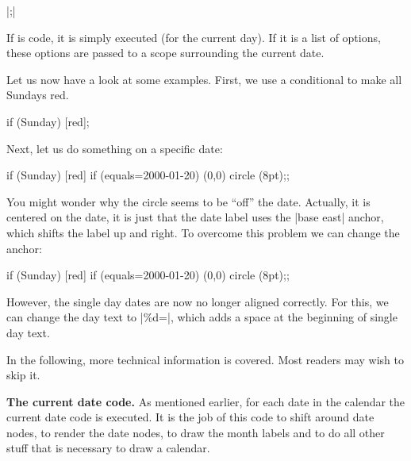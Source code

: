 \begin{command}{\calendar {}|;|}
\begin{enumerate}
    If  is code, it is simply executed (for the
    current day). If it is a list of options, these options are passed
    to a scope surrounding the current date.
  \end{enumerate}
  Let us now have a look at some examples. First, we use a conditional
  to make all Sundays red.
\begin{codeexample}[]
\tikz
  \calendar
    [dates=2000-01-01 to 2000-01-31,week list]
    if (Sunday) [red];
\end{codeexample}
  Next, let us do something on a specific date:
\begin{codeexample}[]
\tikz
  \calendar
    [dates=2000-01-01 to 2000-01-31,week list]
    if (Sunday)            [red]
    if (equals=2000-01-20) {\draw (0,0) circle (8pt);};
\end{codeexample}
  You might wonder why the circle seems to be ``off'' the
  date. Actually, it is centered on the date, it is just that the date
  label uses the |base east| anchor, which shifts the label up and
  right. To overcome this problem we can change the anchor:
\begin{codeexample}[]
\tikz [every day/.style={anchor=mid}]
  \calendar
    [dates=2000-01-01 to 2000-01-31,week list]
    if (Sunday)            [red]
    if (equals=2000-01-20) {\draw (0,0) circle (8pt);};
\end{codeexample}
  However, the single day dates are now no longer aligned
  correctly. For this, we can change the day text to |\%d=|,
  which adds a space at the beginning of single day
  text.

  In the following, more technical information is covered. Most
  readers may wish to skip it.

  \medskip
  \textbf{The current date code.}
  As mentioned earlier, for each date in the calendar the current date
  code is executed. It is the job of this code to shift around date
  nodes, to render the date nodes, to draw the month labels and to do
  all other stuff that is necessary to draw a calendar.


\end{command}
